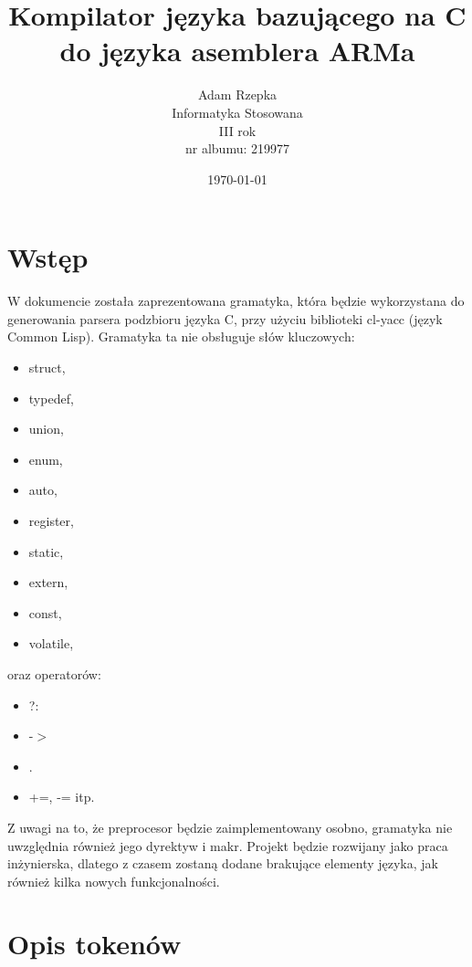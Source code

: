 \documentclass[11pt,a4paper]{article}
\title{Kompilator języka bazującego na C do języka asemblera ARMa}
\author{
  Adam Rzepka\\
  Informatyka Stosowana\\
  III rok\\
  nr albumu: 219977
}
\date{\today}
\begin{document}
\maketitle
\newpage
\section{Wstęp}
W dokumencie została zaprezentowana gramatyka, która będzie wykorzystana do generowania parsera podzbioru języka C, przy użyciu biblioteki cl-yacc (język Common Lisp). Gramatyka ta nie obsługuje słów kluczowych:
\begin{itemize}
\item struct,
\item typedef,
\item union,
\item enum,
\item auto, 
\item register,
\item static,
\item extern,
\item const,
\item volatile,
\end{itemize}
oraz operatorów:
\begin{itemize}
\item ?:
\item -$>$
\item .
\item +=, -= itp.
\end{itemize}
Z uwagi na to, że preprocesor będzie zaimplementowany osobno, gramatyka nie uwzględnia również jego dyrektyw i makr.
Projekt będzie rozwijany jako praca inżynierska, dlatego z czasem zostaną dodane brakujące elementy języka, jak również kilka nowych funkcjonalności.
\newpage
\section{Opis tokenów}
\end{document}
